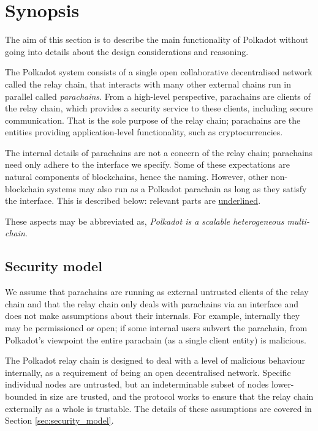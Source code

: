 \section{Synopsis}\label{sec:summary}
The aim of this section is to describe the main functionality of Polkadot without going into details about the design considerations and reasoning.

The Polkadot system consists of a single open collaborative decentralised network called the relay chain, that interacts with many other external chains run in parallel called \emph{parachains}. From a high-level perspective, parachains are clients of the relay chain, which provides a security service to these clients, including secure communication. That is the sole purpose of the relay chain; parachains are the entities providing application-level functionality, such as cryptocurrencies.

The internal details of parachains are not a concern of the relay chain; parachains need only adhere to the interface we specify. Some of these expectations are natural components of blockchains, hence the naming. However, other non-blockchain systems may also run as a Polkadot parachain as long as they satisfy the interface. This is described below: relevant parts are \uline{underlined}.

These aspects may be abbreviated as, \emph{Polkadot is a scalable heterogeneous multi-chain}.

\subsection{Security model}

We assume that parachains are running as external untrusted clients of the relay chain and that the relay chain only deals with parachains via an interface and does not make assumptions about their internals. For example, internally they may be permissioned or open; if some internal users subvert the parachain, from Polkadot's viewpoint the entire parachain (as a single client entity) is malicious.

The Polkadot relay chain is designed to deal with a level of malicious behaviour internally, as a requirement of being an open decentralised network. Specific individual nodes are untrusted, but an indeterminable subset of nodes lower-bounded in size are trusted, and the protocol works to ensure that the relay chain externally as a whole is trustable. The details of these assumptions are covered in Section \ref{sec:security_model}.

